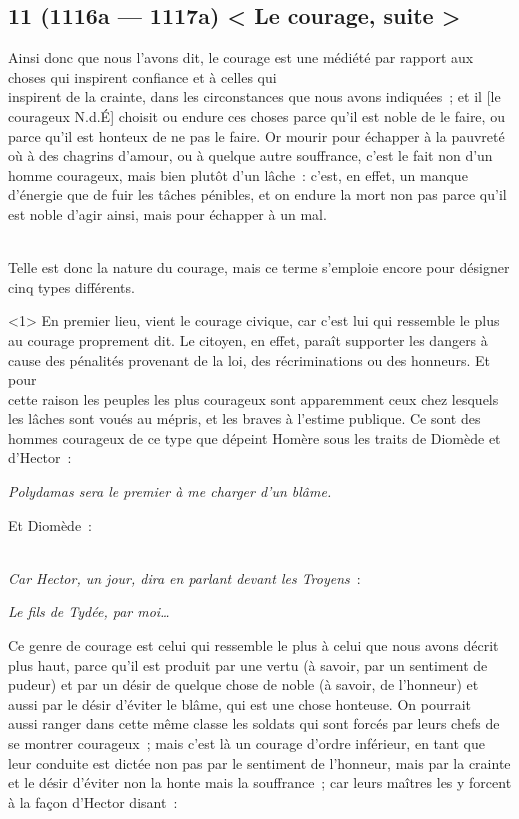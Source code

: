 \documentclass[french,twoside]{book} %
\begin{document}
\subsection[{11 (1116a — 1117a) < Le courage, suite >}]{11 (1116a — 1117a) < Le courage, suite >}
\noindent Ainsi donc que nous l’avons dit, le courage est une médiété par rapport aux choses qui inspirent confiance et à celles qui \\
inspirent de la crainte, dans les circonstances que nous avons indiquées ; et il [le courageux N.d.É] choisit ou endure ces choses parce qu’il est noble de le faire, ou parce qu’il est honteux de ne pas le faire. Or mourir pour échapper à la pauvreté où à des chagrins d’amour, ou à quelque autre souffrance, c’est le fait non d’un homme courageux, mais bien plutôt d’un lâche : c’est, en effet, un manque d’énergie que de fuir les tâches pénibles, et on endure la mort non pas parce qu’il est noble d’agir ainsi, mais pour échapper à un mal.\par
\\
Telle est donc la nature du courage, mais ce terme s’emploie encore pour désigner cinq types différents.\par
<1> En premier lieu, vient le courage civique, car c’est lui qui ressemble le plus au courage proprement dit. Le citoyen, en effet, paraît supporter les dangers à cause des pénalités provenant de la loi, des récriminations ou des honneurs. Et pour \\
cette raison les peuples les plus courageux sont apparemment ceux chez lesquels les lâches sont voués au mépris, et les braves à l’estime publique. Ce sont des hommes courageux de ce type que dépeint Homère sous les traits de Diomède et d’Hector :\par
 {\itshape Polydamas sera le premier à me charger d’un blâme.} \par
Et Diomède :\par
\\
{\itshape Car Hector, un jour, dira en parlant devant les Troyens} : \par
 {\itshape Le fils de Tydée, par moi…} \par
Ce genre de courage est celui qui ressemble le plus à celui que nous avons décrit plus haut, parce qu’il est produit par une vertu (à savoir, par un sentiment de pudeur) et par un désir de quelque chose de noble (à savoir, de l’honneur) et aussi par le désir d’éviter le blâme, qui est une chose honteuse. On pourrait \\
aussi ranger dans cette même classe les soldats qui sont forcés par leurs chefs de se montrer courageux ; mais c’est là un courage d’ordre inférieur, en tant que leur conduite est dictée non pas par le sentiment de l’honneur, mais par la crainte et le désir d’éviter non la honte mais la souffrance ; car leurs maîtres les y forcent à la façon d’Hector disant :\par
\end{document}
